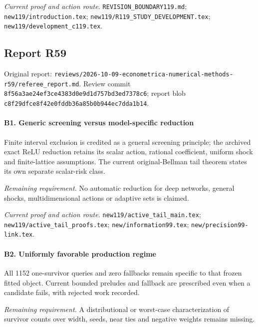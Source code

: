 \par\emph{Current proof and action route.} \nolinkurl{REVISION_BOUNDARY119.md}; \nolinkurl{new119/introduction.tex}; \nolinkurl{new119/R119_STUDY_DEVELOPMENT.tex}; \nolinkurl{new119/development_c119.tex}.

\subsection{Report R59}

Original report: \nolinkurl{reviews/2026-10-09-econometrica-numerical-methods-r59/referee_report.md}. Review commit \nolinkurl{8f56a3ae24ef3ce4383d0e9d1d757bd3ed7378c6}; report blob \nolinkurl{c8f29dfce8f42e0fddb36a85b0b944ec7dda1b14}.

\paragraph{B1. Generic screening versus model-specific reduction}

Finite interval exclusion is credited as a general screening principle; the archived exact ReLU reduction retains its scalar action, rational coefficient, uniform shock and finite-lattice assumptions. The current original-Bellman tail theorem states its own separate scalar-risk class.

\par\emph{Remaining requirement.} No automatic reduction for deep networks, general shocks, multidimensional actions or adaptive sets is claimed.

\par\emph{Current proof and action route.} \nolinkurl{new119/active_tail_main.tex}; \nolinkurl{new119/active_tail_proofs.tex}; \nolinkurl{new/information99.tex}; \nolinkurl{new/precision99-link.tex}.

\paragraph{B2. Uniformly favorable production regime}

All 1152 one-survivor queries and zero fallbacks remain specific to that frozen fitted object. Current bounded preludes and fallback are prescribed even when a candidate fails, with rejected work recorded.

\par\emph{Remaining requirement.} A distributional or worst-case characterization of survivor counts over width, seeds, near ties and negative weights remains missing.

